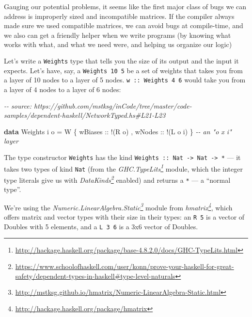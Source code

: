 \documentclass[]{article}
\newenvironment{Shaded}{}{}
\newcommand{\CommentTok}[1]{\textcolor[rgb]{0.38,0.63,0.69}{\textit{#1}}}
\newcommand{\DataTypeTok}[1]{\textcolor[rgb]{0.56,0.13,0.00}{#1}}
\newcommand{\KeywordTok}[1]{\textcolor[rgb]{0.00,0.44,0.13}{\textbf{#1}}}
\newcommand{\NormalTok}[1]{#1}
\newcommand{\OperatorTok}[1]{\textcolor[rgb]{0.40,0.40,0.40}{#1}}
\newcommand{\OtherTok}[1]{\textcolor[rgb]{0.00,0.44,0.13}{#1}}
\renewcommand{\href}[2]{#2\footnote{\url{#1}}}
\begin{document}
Gauging our potential problems, it seems like the first major class of bugs we
can address is improperly sized and incompatible matrices. If the compiler
always made sure we used compatible matrices, we can avoid bugs at compile-time,
and we also can get a friendly helper when we write programs (by knowing what
works with what, and what we need were, and helping us organize our logic)

Let's write a \texttt{Weights} type that tells you the size of its output and
the input it expects. Let's have, say, a \texttt{Weights\ 10\ 5} be a set of
weights that takes you from a layer of 10 nodes to a layer of 5 nodes.
\texttt{w\ ::\ Weights\ 4\ 6} would take you from a layer of 4 nodes to a layer
of 6 nodes:

\begin{Shaded}
\begin{Highlighting}[]
\CommentTok{{-}{-} source: https://github.com/mstksg/inCode/tree/master/code{-}samples/dependent{-}haskell/NetworkTyped.hs\#L21{-}L23}

\KeywordTok{data} \DataTypeTok{Weights}\NormalTok{ i o }\OtherTok{=} \DataTypeTok{W}\NormalTok{ \{}\OtherTok{ wBiases ::} \OperatorTok{!}\NormalTok{(}\DataTypeTok{R}\NormalTok{ o)}
\NormalTok{                     ,}\OtherTok{ wNodes  ::} \OperatorTok{!}\NormalTok{(}\DataTypeTok{L}\NormalTok{ o i)}
\NormalTok{                     \}                      }\CommentTok{{-}{-} an "o x i" layer}
\end{Highlighting}
\end{Shaded}

The type constructor \texttt{Weights} has the kind
\texttt{Weights\ ::\ Nat\ -\textgreater{}\ Nat\ -\textgreater{}\ *} --- it takes
two types of kind \texttt{Nat} (from the
\emph{\href{http://hackage.haskell.org/package/base-4.8.2.0/docs/GHC-TypeLits.html}{GHC.TypeLits}}
module, which the integer type literals give us with
\emph{\href{https://www.schoolofhaskell.com/user/konn/prove-your-haskell-for-great-safety/dependent-types-in-haskell\#type-level-naturals}{DataKinds}}
enabled) and returns a \texttt{*} --- a ``normal type''.

We're using the
\emph{\href{http://mstksg.github.io/hmatrix/Numeric-LinearAlgebra-Static.html}{Numeric.LinearAlgebra.Static}}
module from \emph{\href{http://hackage.haskell.org/package/hmatrix}{hmatrix}},
which offers matrix and vector types with their size in their types: an
\texttt{R\ 5} is a vector of Doubles with 5 elements, and a \texttt{L\ 3\ 6} is
a 3x6 vector of Doubles.
\end{document}
